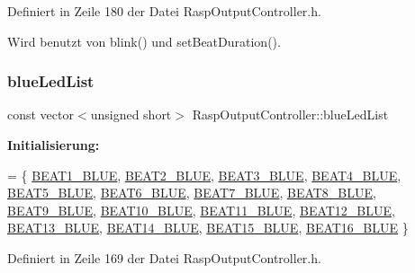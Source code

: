 Definiert in Zeile 180 der Datei Rasp\+Output\+Controller.\+h.



Wird benutzt von blink() und set\+Beat\+Duration().

\mbox{\label{class_rasp_output_controller_a9b5e5c4ee94d43d62e41961e6c8bea3b}} 
\subsubsection{\texorpdfstring{blue\+Led\+List}{blueLedList}}
{\footnotesize\ttfamily const vector$<$unsigned short$>$ Rasp\+Output\+Controller\+::blue\+Led\+List\hspace{0.3cm}{\ttfamily [private]}}

{\bfseries Initialisierung\+:}
\begin{DoxyCode}
= \{
            \hyperlink{namespaceoutputs_a7c39d2e5116c2502c2b90bf1e8be5520}{BEAT1\_BLUE}, \hyperlink{namespaceoutputs_ac6bffee9716f79b218c8fb366351032e}{BEAT2\_BLUE}, \hyperlink{namespaceoutputs_ae87166c20e497c5b092a92bc98da94c2}{BEAT3\_BLUE}, 
      \hyperlink{namespaceoutputs_aa66f074e1960dc7dbf507acdf6cc5ae3}{BEAT4\_BLUE}, \hyperlink{namespaceoutputs_a0fab71f89a857d67f1329fbd097046ae}{BEAT5\_BLUE}, \hyperlink{namespaceoutputs_a1981eea86b118b5ff49c09ee50a75221}{BEAT6\_BLUE}, \hyperlink{namespaceoutputs_a7051f5db20e6f0c0dc7dad8775d21b1f}{BEAT7\_BLUE}, 
      \hyperlink{namespaceoutputs_a29cf0b90cc4df367e62aaaa86e7ed24e}{BEAT8\_BLUE}, \hyperlink{namespaceoutputs_a1f88716cbf83123bc10bd31b07f86b4c}{BEAT9\_BLUE},
            \hyperlink{namespaceoutputs_a188668f7db5d9610361658c817b08574}{BEAT10\_BLUE}, \hyperlink{namespaceoutputs_a31d60b8c00551d3dbeca8645eba200eb}{BEAT11\_BLUE}, \hyperlink{namespaceoutputs_ae7b144325945c1712151bf0d6a363c5f}{BEAT12\_BLUE}, 
      \hyperlink{namespaceoutputs_a38a0eba17cc5ed8eed42c37dca1feb3f}{BEAT13\_BLUE}, \hyperlink{namespaceoutputs_ab384095ae250cb117a95683710620188}{BEAT14\_BLUE}, \hyperlink{namespaceoutputs_a6d12c95904da18827ed262896b9ebaa1}{BEAT15\_BLUE}, 
      \hyperlink{namespaceoutputs_aaa4685feacdb3e8d2bb1c0435952e030}{BEAT16\_BLUE}
    \}
\end{DoxyCode}


Definiert in Zeile 169 der Datei Rasp\+Output\+Controller.\+h.

